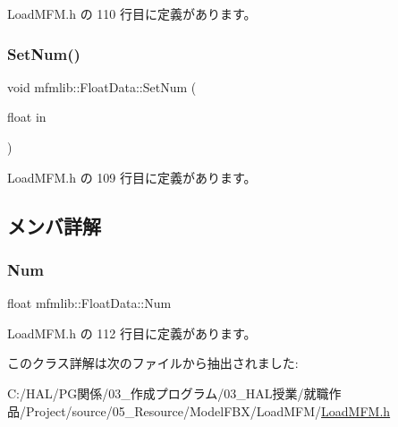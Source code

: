  Load\+M\+F\+M.\+h の 110 行目に定義があります。

\mbox{\label{classmfmlib_1_1_float_data_a7c74124a56e159cdb8e9b540833daac2}} 
\subsubsection{\texorpdfstring{Set\+Num()}{SetNum()}}
{\footnotesize\ttfamily void mfmlib\+::\+Float\+Data\+::\+Set\+Num (\begin{DoxyParamCaption}\item[{float}]{in }\end{DoxyParamCaption})\hspace{0.3cm}{\ttfamily [inline]}}



 Load\+M\+F\+M.\+h の 109 行目に定義があります。



\subsection{メンバ詳解}
\mbox{\label{classmfmlib_1_1_float_data_a3064dd32941160b19e6d2b6270119690}} 
\subsubsection{\texorpdfstring{Num}{Num}}
{\footnotesize\ttfamily float mfmlib\+::\+Float\+Data\+::\+Num\hspace{0.3cm}{\ttfamily [private]}}



 Load\+M\+F\+M.\+h の 112 行目に定義があります。



このクラス詳解は次のファイルから抽出されました\+:\begin{DoxyCompactItemize}
\item 
C\+:/\+H\+A\+L/\+P\+G関係/03\+\_\+作成プログラム/03\+\_\+\+H\+A\+L授業/就職作品/\+Project/source/05\+\_\+\+Resource/\+Model\+F\+B\+X/\+Load\+M\+F\+M/\mbox{\hyperlink{_load_m_f_m_8h}{Load\+M\+F\+M.\+h}}\end{DoxyCompactItemize}
